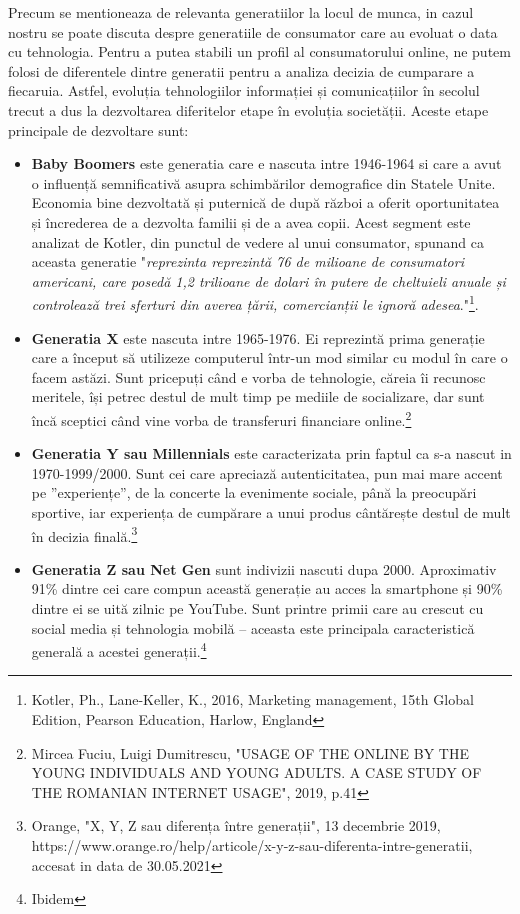 \documentclass[a4paper, 12pt]{article}
\begin{document}
		\quad Precum se mentioneaza de relevanta generatiilor la locul de munca, in cazul nostru se poate discuta despre generatiile de consumator care au evoluat o data cu tehnologia. Pentru a putea stabili un profil al consumatorului online, ne putem folosi de diferentele dintre generatii pentru a analiza decizia de cumparare a fiecaruia. Astfel, evoluția tehnologiilor informației și comunicațiilor în secolul trecut a dus la dezvoltarea diferitelor etape în evoluția societății. Aceste etape principale de dezvoltare sunt:
		\begin{itemize}
		\item\textbf{Baby Boomers} este generatia care e nascuta intre 1946-1964 si care a avut o influență semnificativă asupra schimbărilor demografice din Statele Unite. Economia bine dezvoltată și puternică de după război a oferit oportunitatea și încrederea de a dezvolta familii și de a avea copii. Acest segment este analizat de Kotler, din punctul de vedere al unui consumator, spunand ca aceasta generatie "\textit{reprezinta reprezintă 76 de milioane de consumatori americani, care posedă 1,2 trilioane de dolari în putere de cheltuieli anuale și controlează trei sferturi din averea țării, comercianții le ignoră adesea}."\footnote{Kotler, Ph., Lane-Keller, K., 2016, Marketing management, 15th Global Edition, Pearson Education, Harlow, England}.
		\item\textbf{Generatia X} este nascuta intre 1965-1976. Ei reprezintă prima generație care a început să utilizeze computerul într-un mod similar cu modul în care o facem astăzi. Sunt pricepuți când e vorba de tehnologie, căreia îi recunosc meritele, își petrec destul de mult timp pe mediile de socializare, dar sunt încă sceptici când vine vorba de transferuri financiare online.\footnote{Mircea Fuciu, Luigi Dumitrescu, "USAGE OF THE ONLINE BY THE YOUNG INDIVIDUALS AND YOUNG ADULTS. A CASE STUDY OF THE ROMANIAN INTERNET USAGE", 2019, p.41 }
		\item\textbf{Generatia Y sau Millennials} este caracterizata prin faptul ca s-a nascut in 1970-1999/2000.  Sunt cei care apreciază autenticitatea, pun mai mare accent pe ”experiențe”, de la concerte la evenimente sociale, până la preocupări sportive, iar experiența de cumpărare a unui produs cântărește destul de mult în decizia finală.\footnote{Orange, "X, Y, Z sau diferența între generații", 13 decembrie 2019, https://www.orange.ro/help/articole/x-y-z-sau-diferenta-intre-generatii, accesat in data de 30.05.2021}
		\item\textbf{Generatia Z sau Net Gen} sunt indivizii nascuti dupa 2000. Aproximativ 91\% dintre cei care compun această generație au acces la smartphone și 90\% dintre ei se uită zilnic pe YouTube. Sunt printre primii care au crescut cu social media și tehnologia mobilă – aceasta este principala caracteristică generală a acestei generații.\footnote{Ibidem}
		\end{itemize}
\end{document}
